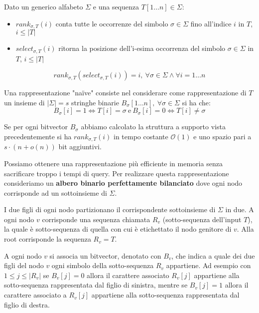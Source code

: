 Dato un generico alfabeto $\Sigma$ e una sequenza $T[1\dots n] \in \Sigma$:
\begin{itemize}
    \item $rank_{\sigma,T} (i)$ conta tutte le occorrenze del simbolo $\sigma \in \Sigma$
          fino all'indice $i$ in $T$, $i \leq | T |$
    \item $select_{\sigma,T} (i)$ ritorna la posizione dell'i-esima occorrenza
          del simbolo $\sigma \in \Sigma$ in $T$, $i \leq | T |$
\end{itemize}
\begin{equation}
    rank_{\sigma,T} (select_{\sigma,T} (i)) = i, \ \forall \sigma \in \Sigma \land \forall i = 1 \dots n
\end{equation}


Una rappresentazione "naïve" consiste nel considerare come rappresentazione di
$T$ un insieme di $| \Sigma | = s$ stringhe binarie $B_\sigma[1\dots n], \ \forall \sigma \in \Sigma$ si ha che:
\begin{equation}
    B_\sigma[i] = 1 \iff T[i] = \sigma \ \text{e} \ B_\sigma[i] = 0  \iff T[i] \neq \sigma
\end{equation}

Se per ogni bitvector $B_\sigma$ abbiamo calcolato la struttura a supporto vista
precedentemente si ha $rank_{\sigma,T} (i)$ in tempo costante $\mathcal{O}(1)$ e
uno spazio pari a $s \cdot (n + o(n))$ bit aggiuntivi.

Possiamo ottenere una rappresentazione più efficiente in memoria senza sacrificare
troppo i tempi di query. Per realizzare questa rappresentazione consideriamo un
\textbf{albero binario perfettamente bilanciato} dove ogni nodo corrisponde ad un
sottoinsieme di $\Sigma$.

I due figli di ogni nodo partizionano il corrispondente sottoinsieme di $\Sigma$
in due. A ogni nodo $v$ corrisponde una sequenza chiamata $R_v$ (sotto-sequenza dell'input $T$),
la quale è sotto-sequenza di quella con cui è etichettato il nodo genitore di $v$.
Alla root corrisponde la sequenza $R_v = T$.

A ogni nodo $v$ si associa un bitvector, denotato con $B_v$, che indica a quale
dei due figli del nodo $v$ ogni simbolo della sotto-sequenza $R_v$ appartiene.
Ad esempio con $1 \leq j \leq |R_v|$ se $B_v [j] = 0$ allora il carattere associato
$R_v [j]$ appartiene alla sotto-sequenza rappresentata dal figlio di sinistra,
mentre se $B_v [j] = 1$ allora il carattere associato a $R_v [j]$ appartiene alla
sotto-sequenza rappresentata dal figlio di destra.

